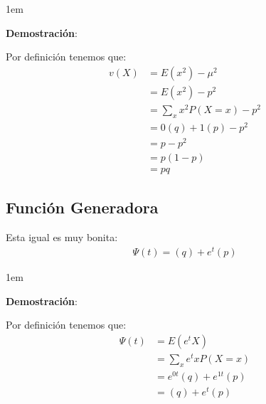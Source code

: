 \documentclass[12pt, fleqn]{report}                             %
\newenvironment{SmallIndentation}[1][0.75em]                    %
        {\begin{adjustwidth}{#1}{}\begin{footnotesize}}             %
        {\end{footnotesize}\end{adjustwidth}}                       %
\theoremstyle{break}                                            %
\begin{document}
                \begin{SmallIndentation}[1em]
                    \textbf{Demostración}:
                    
                    Por definición tenemos que:
                    \begin{align*}
                        v(X)
                            &= E(x^2) - \mu^2               \\
                            &= E(x^2) - p^2                 \\
                            &= \sum_x x^2 P(X = x) - p^2    \\
                            &= 0(q) + 1(p) - p^2            \\
                            &= p - p^2                      \\
                            &= p(1 - p)                     \\
                            &= pq
                    \end{align*}
                
                \end{SmallIndentation}
                        

            \clearpage
            \subsection{Función Generadora}

                Esta igual es muy bonita:
                \begin{align*}
                    \Psi(t) = (q) + e^t(p)
                \end{align*}

                \begin{SmallIndentation}[1em]
                    \textbf{Demostración}:
                    
                    Por definición tenemos que:
                    \begin{align*}
                        \Psi(t) 
                            &= E(e^tX)                      \\
                            &= \sum_x e^tx P(X = x)         \\
                            &= e^{0t}(q) + e^{1t}(p)        \\
                            &= (q) + e^t(p)   
                    \end{align*}
                
                \end{SmallIndentation}
                    
\end{document}
